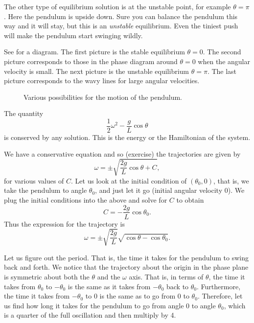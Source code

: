\documentclass[12pt]{book}
\begin{document}
The other type of equilibrium solution is at the unstable point, for example
$\theta = \pi$.  Here the pendulum is upside down.  Sure you can balance the
pendulum this way and it will stay, but this is an \emph{unstable} equilibrium.
Even the tiniest push will make the pendulum start swinging wildly.

See  for a diagram.  The first picture is the
stable equilibrium $\theta = 0$.  The second picture corresponds to those
 in the phase diagram around $\theta =0$ when the angular
velocity is small.  The next picture is the unstable equilibrium $\theta =
\pi$.  The last picture corresponds to the wavy lines for large angular
velocities.

\begin{figure}[h!t]
\capstart
\begin{center}
\caption{Various possibilities for the motion of the pendulum. \label{fig:nlin-pend}}
\end{center}
\end{figure}

The quantity 
\begin{equation*}
\frac{1}{2} \omega^2  - \frac{g}{L} \cos \theta 
\end{equation*}
is conserved by any solution.  This is the energy or the Hamiltonian of
the system.

We have a conservative equation and so (exercise) the
trajectories are given by
\begin{equation*}
\omega = \pm \sqrt{ \frac{2g}{L} \cos \theta + C} ,
\end{equation*}
for various values of $C$.  
Let us look at the initial condition of $(\theta_0,0)$,
that is, we take the pendulum to
angle $\theta_0$, and just let it go (initial angular velocity 0).
We plug the initial conditions into the above and solve for $C$ to obtain
\begin{equation*}
C = - \frac{2g}{L} \cos \theta_0 .
\end{equation*}
Thus the expression for the trajectory is
\begin{equation*}
\omega = \pm \sqrt{ \frac{2g}{L}} \sqrt{ \cos \theta - \cos \theta_0 } .
\end{equation*}

Let us figure out the period.  That is, the time it takes for the pendulum
to swing back and forth.
We notice that the trajectory about the
origin in the phase plane is symmetric about both the $\theta$ and the
$\omega$ axis.  That is, in terms of $\theta$,
the time it takes from $\theta_0$ to $-\theta_0$
is the same as it takes from $-\theta_0$ back to $\theta_0$.  Furthermore,
the time it takes from $-\theta_0$ to $0$ is the same as to go from $0$ to
$\theta_0$.  Therefore, let us find how long it takes for
the pendulum to go from angle 0 to angle $\theta_0$, which is a quarter of
the full oscillation and then multiply by 4.
\end{document}

